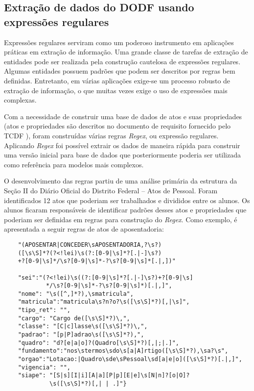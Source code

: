 \documentclass[12pt]{article}
\begin{document}
\subsection{Extração de dados do DODF usando expressões regulares}
\label{sec:regex}
Expressões regulares serviram como um poderoso instrumento em aplicações práticas em extração de  informação. Uma grande classe de tarefas de extração de entidades pode ser realizada pela construção cautelosa de expressões regulares. Algumas entidades possuem padrões que podem ser descritos por regras bem definidas. Entretanto, em várias aplicações exige-se um processo robusto de extração de informação, o que muitas vezes exige o uso de expressões mais complexas.

Com a necessidade de construir uma base de dados de atos e suas propriedades (atos e propriedades são descritos no documento de requisito fornecido pelo TCDF \cite{cardoso_Especificacao_tcdf2019}), foram construídas várias regras \textit{Regex}, ou expressão regulares. Aplicando \textit{Regex} foi possível extrair os dados de maneira rápida para construir uma versão inicial para base de dados que posteriormente poderia ser utilizada como referência para modelos mais complexos.

O desenvolvimento das regras partiu de uma análise primária da estrutura da Seção II do Diário Oficial do Distrito Federal -- Atos de Pessoal. Foram identificados 12 atos que poderiam ser trabalhados e divididos entre os alunos. Os alunos ficaram responsáveis de identificar padrões desses atos e propriedades que poderiam ser definidas em regras para construção do \textit{Regex}. Como exemplo, é apresentada a seguir regras de atos de aposentadoria:
\begin{lstlisting}
    "(APOSENTAR|CONCEDER\sAPOSENTADORIA,?\s?)
    ([\s\S]*?(?<!lei)\s(?:[0-9|\s]*?[.|-]\s?)
    +?[0-9|\s]*/\s?[0-9|\s]*-?\s?[0-9|\s]*[.|,])"

    "sei":"(?<!lei)\s((?:[0-9|\s]*?[.|-]\s?)+?[0-9|\s]
            */\s?[0-9|\s]*-?\s?[0-9|\s]*)[.|,]",
    "nome": "\s([^,]*?),\smatricula",
    "matricula":"matricula\s?n?o?\s([\s\S]*?)[,|\s]",
    "tipo_ret": "",
    "cargo": "Cargo de([\s\S]*?)\,",
    "classe": "[C|c]lasse\s([\s\S]*?)\,",
    "padrao": "[p|P]adrao\s([\s\S]*?),",
    "quadro": "d?[e|a|o]?(Quadro[\s\S]*?)[,|;|.]",
    "fundamento":"nos\stermos\sdo\s[a|A]rtigo([\s\S]*?),\sa?\s",
    "orgao":"Lotacao:|Quadro\sde\sPessoal\sd[a|e|o]([\s\S]*?)[.|,]",
    "vigencia": "",
    "siape": "[S|s][I|i][A|a][P|p][E|e]\s[N|n]?[o|O]?
             \s([\s\S]*?)[,| | .]"} 
\end{lstlisting}
\end{document}
